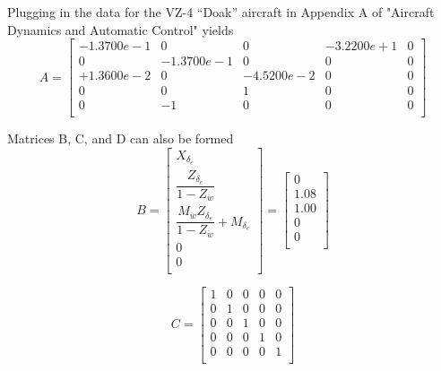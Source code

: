 \documentclass[12pt]{article}
\begin{document}
\noindent Plugging in the data for the VZ-4 ``Doak'' aircraft in Appendix A of "Aircraft Dynamics and Automatic Control" yields
\begin{equation*}
A =
\begin{bmatrix}
  -1.3700e-1 &          0 &          0 & -3.2200e+1 &           0 \\
           0 & -1.3700e-1 &          0 &          0 &           0 \\
  +1.3600e-2 &          0 & -4.5200e-2 &          0 &           0 \\
           0 &          0 & 1         &          0 &           0 \\
           0 & -1         &          0 &          0 &           0 \\
\end{bmatrix}
\end{equation*}

\noindent Matrices B, C, and D can also be formed
\begin{equation*}
B =
\begin{bmatrix}
   X_{\delta_e} \\
   \dfrac{Z_{\delta_e}}{1-Z_{\dot{w}}} \\
   \dfrac{M_{\dot{w}} Z_{\delta_e}}{1-Z_{\dot{w}}} + M_{\delta_e} \\
   0 \\
   0 \\
\end{bmatrix}
=
\begin{bmatrix}
            0 \\
         1.08 \\
         1.00 \\
            0 \\
            0 \\
\end{bmatrix}
\end{equation*}

\begin{equation*}
C =
\begin{bmatrix}
      1 & 0 & 0 & 0 & 0 \\
      0 & 1 & 0 & 0 & 0 \\
      0 & 0 & 1 & 0 & 0 \\
      0 & 0 & 0 & 1 & 0 \\
      0 & 0 & 0 & 0 & 1 \\
\end{bmatrix}
\end{equation*}
\end{document}
